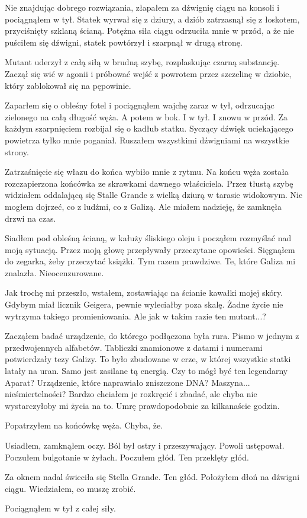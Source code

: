 Nie znajdując dobrego rozwiązania, złapałem za dźwignię ciągu na konsoli i pociągnąłem w tył.
Statek wyrwał się z dziury, a dziób zatrzasnął się z łoskotem, przyciśnięty szklaną ścianą.
Potężna siła ciągu odrzuciła mnie w przód, a że nie puściłem się dźwigni, statek powtórzył i szarpnął w drugą stronę.

Mutant uderzył z całą siłą w brudną szybę, rozplaskując czarną substancję. Zaczął się wić w agonii i próbować wejść z powrotem przez szczelinę w dziobie, który zablokował się na pępowinie.

Zaparłem się o obleśny fotel i pociągnąłem wajchę zaraz w tył, odrzucając zielonego na całą długość węża.
A potem w bok. I w tył. I znowu w przód.
Za każdym szarpnięciem rozbijał się o kadłub statku.
Syczący dźwięk uciekającego powietrza tylko mnie poganiał.
Ruszałem wszystkimi dźwigniami na wszystkie strony.

Zatrzaśnięcie się włazu do końca wybiło mnie z rytmu.
Na końcu węża została rozczapierzona końcówka ze skrawkami dawnego właściciela.
Przez tłustą szybę widziałem oddalającą się Stalle Grande z wielką dziurą w tarasie widokowym.
Nie mogłem dojrzeć, co z ludźmi, co z Galizą.
Ale miałem nadzieję, że zamknęła drzwi na czas.

Siadłem pod obleśną ścianą, w kałuży śliskiego oleju i począłem rozmyślać nad moją sytuacją.
Przez moją głowę przepływały przeczytane opowieści.
Sięgnąłem do zegarka, żeby przeczytać książki. Tym razem prawdziwe.
Te, które Galiza mi znalazła. Nieocenzurowane.

Jak trochę mi przeszło, wstałem, zostawiając na ścianie kawałki mojej skóry.
Gdybym miał licznik Geigera, pewnie wyleciałby poza skalę.
Żadne życie nie wytrzyma takiego promieniowania.
Ale jak w takim razie ten mutant...?

Zacząłem badać urządzenie, do którego podłączona była rura. 
Pismo w jednym z przedwojennych alfabetów.
Tabliczki znamionowe z datami i numerami potwierdzały tezy Galizy.
To było zbudowane w erze, w której wszystkie statki latały na uran.
Samo jest zasilane tą energią.
Czy to mógł być ten legendarny Aparat?
Urządzenie, które naprawiało zniszczone DNA? Maszyna... nieśmiertelności?
Bardzo chciałem je rozkręcić i zbadać, ale chyba nie wystarczyłoby mi życia na to.
Umrę prawdopodobnie za kilkanaście godzin. 

Popatrzyłem na końcówkę węża.
Chyba, że.

Usiadłem, zamknąłem oczy.
Ból był ostry i przeszywający.
Powoli ustępował.
Poczułem bulgotanie w żyłach.
Poczułem głód.
Ten przeklęty głód.

Za oknem nadal świeciła się Stella Grande. Ten głód.
Położyłem dłoń na dźwigni ciągu. Wiedziałem, co muszę zrobić.

Pociągnąłem w tył z całej siły.



